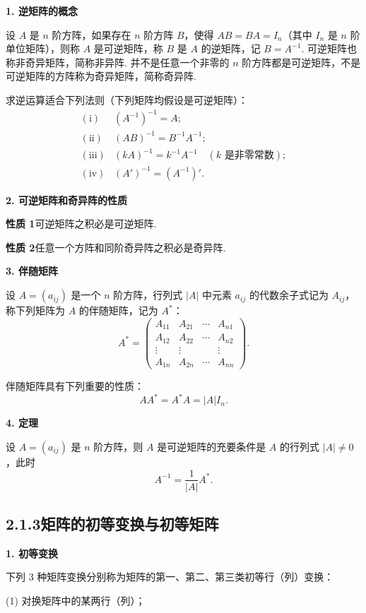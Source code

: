 \documentclass[UTF8, 12pt, fontset=fandol, oneside]{ctexart}
\begin{document}
\noindent\textbf{1. 逆矩阵的概念}

设 $A$ 是 $n$ 阶方阵，如果存在 $n$ 阶方阵 $B$，使得 $AB=BA=I_n$（其中 $I_n$ 是 $n$ 阶单位矩阵），则称 $A$ 是可逆矩阵，称 $B$ 是 $A$ 的逆矩阵，记 $B=A^{-1}$. 可逆矩阵也称非奇异矩阵，简称非异阵. 并不是任意一个非零的 $n$ 阶方阵都是可逆矩阵，不是可逆矩阵的方阵称为奇异矩阵，简称奇异阵.

求逆运算适合下列法则（下列矩阵均假设是可逆矩阵）：
\[
\begin{array}{ll}
\mathrm{(i)} & (A^{-1})^{-1}=A;\\
\mathrm{(ii)} & (AB)^{-1}=B^{-1}A^{-1};\\
\mathrm{(iii)} & (kA)^{-1}=k^{-1}A^{-1}\quad(k\text{ 是非零常数});\\
\mathrm{(iv)} & (A')^{-1}=(A^{-1})'.
\end{array}
\]

\noindent\textbf{2. 可逆矩阵和奇异阵的性质}

\noindent\textbf{性质 1}\quad 可逆矩阵之积必是可逆矩阵.

\noindent\textbf{性质 2}\quad 任意一个方阵和同阶奇异阵之积必是奇异阵.

\noindent\textbf{3. 伴随矩阵}

设 $A=(a_{ij})$ 是一个 $n$ 阶方阵，行列式 $|A|$ 中元素 $a_{ij}$ 的代数余子式记为 $A_{ij}$，称下列矩阵为 $A$ 的伴随矩阵，记为 $A^*$：
\[
A^*=
\left(
\begin{array}{cccc}
A_{11} & A_{21} & \cdots & A_{n1}\\
A_{12} & A_{22} & \cdots & A_{n2}\\
\vdots & \vdots & & \vdots\\
A_{1n} & A_{2n} & \cdots & A_{nn}
\end{array}
\right).
\]

伴随矩阵具有下列重要的性质：
\[
AA^*=A^*A=|A|I_n.
\]

\noindent\textbf{4. 定理}

设 $A=(a_{ij})$ 是 $n$ 阶方阵，则 $A$ 是可逆矩阵的充要条件是 $A$ 的行列式 $|A|\ne0$，此时
\[
A^{-1}=\frac1{|A|}A^*.
\]

\subsection*{2.1.3\quad 矩阵的初等变换与初等矩阵}

\noindent\textbf{1. 初等变换}

下列 3 种矩阵变换分别称为矩阵的第一、第二、第三类初等行（列）变换：

(1) 对换矩阵中的某两行（列）；
\end{document}
